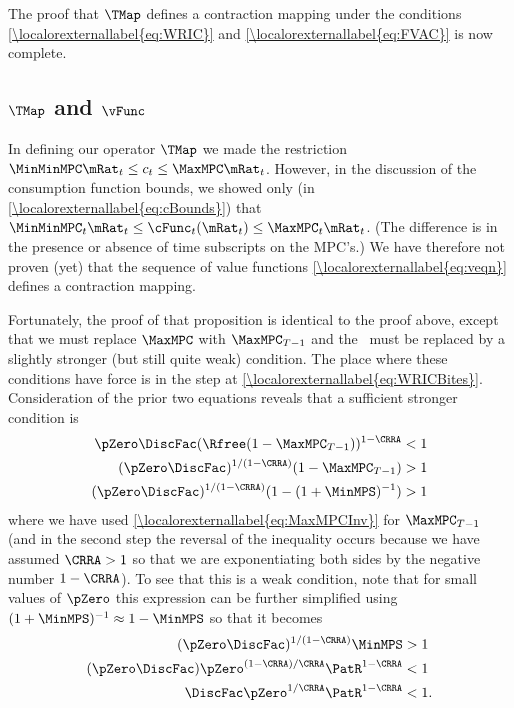 \documentclass[\econtexRoot/BufferStockTheory]{subfiles}
\begin{document}
The proof that $\TMap$ defines a contraction mapping under the
conditions \eqref{\localorexternallabel{eq:WRIC}} and \eqref{\localorexternallabel{eq:FVAC}} is
now complete.

\subsection{$\TMap$ and $\vFunc$}

In defining our operator $\TMap$ we made the restriction
$\MinMinMPC \mRat_{t} \leq c_{t} \leq \MaxMPC \mRat_{t}$.  However,
in the discussion of the consumption function bounds, we
showed only (in \eqref{\localorexternallabel{eq:cBounds}}) that $\MinMinMPC_{t} \mRat_{t} \leq \cFunc_{t}(\mRat_{t})
\leq \MaxMPC_{t} \mRat_{t}$.  (The difference is in the presence
or absence of time subscripts on the MPC's.)
  We have therefore
not proven (yet) that the sequence of value functions \eqref{\localorexternallabel{eq:veqn}} defines a contraction mapping.

Fortunately, the proof of that proposition is identical to the proof above, except that we must replace
$\MaxMPC$ with $\MaxMPC_{T-1}$ and the \WRIC~must be
replaced by a slightly stronger (but still quite weak) condition.  The place where these
conditions have force is in the step at \eqref{\localorexternallabel{eq:WRICBites}}.
Consideration of the prior two equations reveals that
a sufficient stronger condition is
\begin{align*}
    \pZero \DiscFac (\Rfree (1-\MaxMPC_{T-1}))^{1-\CRRA}  & < 1
\\  (\pZero \DiscFac)^{1/(1-\CRRA)}  (1-\MaxMPC_{T-1})  & > 1
\\  (\pZero \DiscFac)^{1/(1-\CRRA)}  (1-(1+\MinMPS)^{-1})  & > 1
\end{align*}
where we have used \eqref{\localorexternallabel{eq:MaxMPCInv}} for $\MaxMPC_{T-1}$ (and in the second step the reversal of the inequality occurs because we have assumed $\CRRA > 1$ so that we are exponentiating both sides by the negative number $1-\CRRA$).  To see that this is a weak condition, note that for small values of
$\pZero$ this expression can be further simplified using $(1+\MinMPS)^{-1}
\approx 1-\MinMPS$ so that it becomes
\begin{align*}
  (\pZero \DiscFac)^{1/(1-\CRRA)}  \MinMPS  & > 1
\\  (\pZero \DiscFac)  \pZero^{(1-\CRRA)/\CRRA} \PatR^{1-\CRRA}  & < 1
\\  \DiscFac  \pZero^{1/\CRRA} \PatR^{1-\CRRA}  & < 1.
\end{align*}
\end{document}
